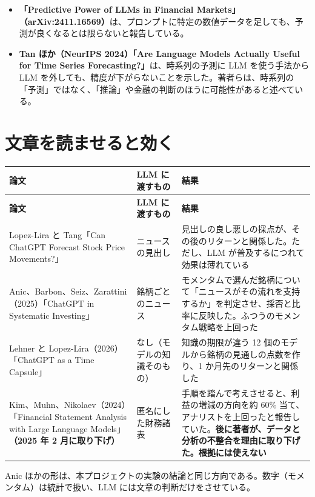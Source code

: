 \documentclass[xelatex,ja=standard,jafont=hiragino-pron,a4paper,10pt]{bxjsreport}
\begin{document}
\begin{itemize}
\item \textbf{「Predictive Power of LLMs in Financial Markets」（arXiv:2411.16569）}は、プロンプトに特定の数値データを足しても、予測が良くなるとは限らないと報告している。
\item \textbf{Tan ほか（NeurIPS 2024）「Are Language Models Actually Useful for Time Series Forecasting?」}は、時系列の予測に LLM を使う手法から LLM を外しても、精度が下がらないことを示した。著者らは、時系列の「予測」ではなく、「推論」や金融の判断のほうに可能性があると述べている。
\end{itemize}

\section{文章を読ませると効く}

\begin{longtable}{p{4.60cm}p{3.40cm}p{6.40cm}}
\toprule
\textbf{論文} & \textbf{LLM に渡すもの} & \textbf{結果} \\
\midrule
\endfirsthead
\toprule
\textbf{論文} & \textbf{LLM に渡すもの} & \textbf{結果} \\
\midrule
\endhead
\bottomrule
\endfoot
Lopez-Lira と Tang「Can ChatGPT Forecast Stock Price Movements?」 & ニュースの見出し & 見出しの良し悪しの採点が、その後のリターンと関係した。ただし、LLM が普及するにつれて効果は薄れている \\
Anic、Barbon、Seiz、Zarattini（2025）「ChatGPT in Systematic Investing」 & 銘柄ごとのニュース & モメンタムで選んだ銘柄について「ニュースがその流れを支持するか」を判定させ、採否と比率に反映した。ふつうのモメンタム戦略を上回った \\
Lehner と Lopez-Lira（2026）「ChatGPT as a Time Capsule」 & なし（モデルの知識そのもの） & 知識の期限が違う 12 個のモデルから銘柄の見通しの点数を作り、1 か月先のリターンと関係した \\
Kim、Muhn、Nikolaev（2024）「Financial Statement Analysis with Large Language Models」\textbf{（2025 年 2 月に取り下げ）} & 匿名にした財務諸表 & 手順を踏んで考えさせると、利益の増減の方向を約 60\% 当て、アナリストを上回ったと報告していた。\textbf{後に著者が、データと分析の不整合を理由に取り下げた。根拠には使えない} \\
\end{longtable}

Anic ほかの形は、本プロジェクトの実験の結論と同じ方向である。数字（モメンタム）は統計で扱い、LLM には文章の判断だけをさせている。
\end{document}
